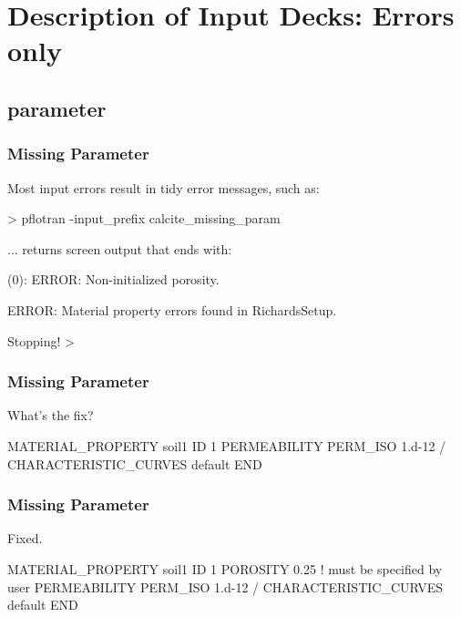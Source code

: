 \documentclass[aspectratio=169]{beamer}
\newcommand\gehcomment[1]{{{\color{orange} #1}}}
\newcommand\redcomment[1]{{{\color{red} #1}}}
\newcommand\bluecomment[1]{{{\color{blue} #1}}}
\newcommand\magentacomment[1]{{{\color{magenta} #1}}}
\begin{document}
\section{Description of Input Decks: Errors only }

\subsection{parameter}

\begin{frame}\frametitle{Missing Parameter}
Most input errors result in tidy error messages, such as:
\begin{semiverbatim}

> pflotran -input_prefix calcite_missing_param

... \gehcomment{returns screen output that ends with:}

  (0): ERROR: Non-initialized porosity.

  ERROR: Material property errors found in RichardsSetup.

  Stopping!
>
\end{semiverbatim}

\end{frame}

\begin{frame}\frametitle{Missing Parameter}
\redcomment{What's the fix?}
\begin{semiverbatim}

MATERIAL_PROPERTY soil1
  ID 1
  PERMEABILITY
    PERM_ISO 1.d-12
  /
  CHARACTERISTIC_CURVES default
END
\end{semiverbatim}

\end{frame}

\begin{frame}\frametitle{Missing Parameter}
\redcomment{Fixed.}
\begin{semiverbatim}

MATERIAL_PROPERTY soil1
  ID 1
  \magentacomment{POROSITY 0.25}   \bluecomment{! must be specified by user}
  PERMEABILITY
    PERM_ISO 1.d-12
  /
  CHARACTERISTIC_CURVES default
END
\end{semiverbatim}

\end{frame}

\end{document}
